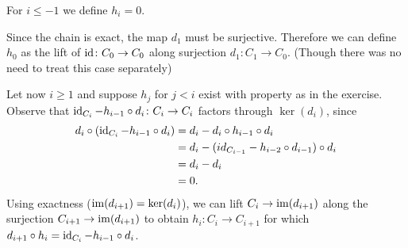\newcommand{\sheet}{2}




\maketitle{}

\begin{exercise}{4}
    For $i \leq -1$ we define $h_i = 0$.

    Since the chain is exact, the map $d_1$ must be surjective. Therefore we can
    define $h_0$ as the lift of $\operatorname{id} \colon C_0 \to C_0$ along surjection $d_1
    \colon C_1 \to C_0$. (Though there was no need to treat this case separately)

    Let now $i \geq 1$ and suppose $h_j$ for $j < i$ exist with property as in the exercise.
    Observe that $\operatorname{id}_{C_i} - h_{i-1} \circ d_i \colon C_i \to C_i$ factors
    through $\ker(d_i)$, since
    \begin{equation*}
        \begin{split}
            d_i \circ (\operatorname{id}_{C_i} - h_{i-1} \circ d_i) &= d_i - d_i \circ h_{i-1}
            \circ d_i \\
            &= d_i - (id_{C_{i-1}} - h_{i-2} \circ d_{i-1}) \circ d_i \\
            &= d_i - d_i \\
            &= 0.
        \end{split}
    \end{equation*}
    Using exactness ($\operatorname{im}(d_{i+1}) = \ker(d_i)$), we can lift $C_i \to
    \operatorname{im}(d_{i+1})$ along the surjection $C_{i+1} \to \operatorname{im}(d_{i+1})$ to obtain $h_i
    \colon C_i \to C_{i+1}$ for which $d_{i+1} \circ h_i = \operatorname{id}_{C_i} - h_{i-1}
    \circ d_i$.

\end{exercise}


